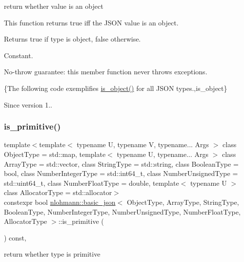 return whether value is an object 

This function returns true iff the J\+S\+ON value is an object.

\begin{DoxyReturn}{Returns}
{\ttfamily true} if type is object, {\ttfamily false} otherwise.
\end{DoxyReturn}
Constant.

No-\/throw guarantee\+: this member function never throws exceptions.

\{The following code exemplifies {\ttfamily \hyperlink{classnlohmann_1_1basic__json_a94ba313c00f1713fa4be85de64083754}{is\+\_\+object()}} for all J\+S\+ON types.,is\+\_\+object\}

\begin{DoxySince}{Since}
version 1.. 
\end{DoxySince}
\hypertarget{classnlohmann_1_1basic__json_adcd6086bac286854d5cc8b7f84d74a49}{}\label{classnlohmann_1_1basic__json_adcd6086bac286854d5cc8b7f84d74a49} 
\subsubsection{\texorpdfstring{is\+\_\+primitive()}{is\_primitive()}}
{\footnotesize\ttfamily template$<$template$<$ typename U, typename V, typename... Args $>$ class Object\+Type = std\+::map, template$<$ typename U, typename... Args $>$ class Array\+Type = std\+::vector, class String\+Type  = std\+::string, class Boolean\+Type  = bool, class Number\+Integer\+Type  = std\+::int64\+\_\+t, class Number\+Unsigned\+Type  = std\+::uint64\+\_\+t, class Number\+Float\+Type  = double, template$<$ typename U $>$ class Allocator\+Type = std\+::allocator$>$ \\
constexpr bool \hyperlink{classnlohmann_1_1basic__json}{nlohmann\+::basic\+\_\+json}$<$ Object\+Type, Array\+Type, String\+Type, Boolean\+Type, Number\+Integer\+Type, Number\+Unsigned\+Type, Number\+Float\+Type, Allocator\+Type $>$\+::is\+\_\+primitive (\begin{DoxyParamCaption}{ }\end{DoxyParamCaption}) const\hspace{0.3cm}{\ttfamily [inline]}, {\ttfamily [noexcept]}}



return whether type is primitive 

